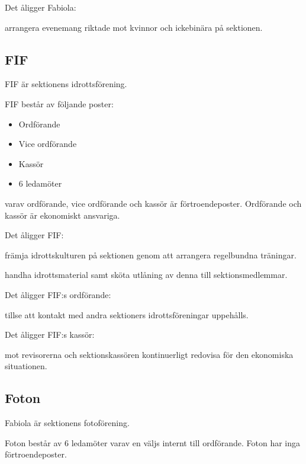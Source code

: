 \documentclass{styrdokument}
\begin{document}
\? Det åligger Fabiola:
\begin{aligganden}
    \item arrangera evenemang riktade mot kvinnor och ickebinära på sektionen.
\end{aligganden}   %

\subsection{FIF}
\? FIF är sektionens idrottsförening.

\? FIF består av följande poster:
\begin{itemize}
    \item Ordförande
	\item Vice ordförande
	\item Kassör
	\item 6 ledamöter
\end{itemize}
varav ordförande, vice ordförande och kassör är förtroendeposter.
Ordförande och kassör är ekonomiskt ansvariga.

\? Det åligger FIF:
\begin{aligganden}
    \item främja idrottskulturen på sektionen genom att arrangera regelbundna träningar.
    \item handha idrottsmaterial samt sköta utlåning av denna till sektionsmedlemmar.
\end{aligganden}

\? Det åligger FIF:s ordförande:
\begin{aligganden}
      \item tillse att kontakt med andra sektioners idrottsföreningar uppehålls.
\end{aligganden}

\? Det åligger FIF:s kassör:
\begin{aligganden}
    \item mot revisorerna och sektionskassören kontinuerligt redovisa för den ekonomiska situationen.
\end{aligganden}

\subsection{Foton}
\? Fabiola är sektionens fotoförening.

\? Foton består av 6 ledamöter varav en väljs internt till ordförande. Foton har inga förtroendeposter.
		
\end{document}

